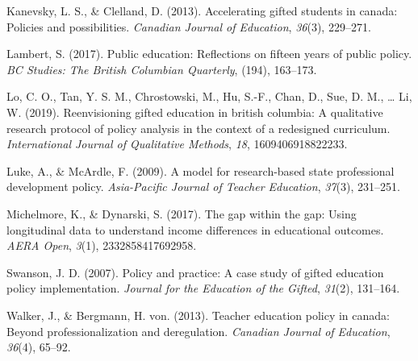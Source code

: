 \documentclass[
  english,
  man,floatsintext]{apa6}
\begin{document}
\leavevmode\hypertarget{ref-kanevsky_2013}{}%
Kanevsky, L. S., \& Clelland, D. (2013). Accelerating gifted students in canada: Policies and possibilities. \emph{Canadian Journal of Education}, \emph{36}(3), 229--271.

\leavevmode\hypertarget{ref-lambert_2017}{}%
Lambert, S. (2017). Public education: Reflections on fifteen years of public policy. \emph{BC Studies: The British Columbian Quarterly}, (194), 163--173.

\leavevmode\hypertarget{ref-lo_2019}{}%
Lo, C. O., Tan, Y. S. M., Chrostowski, M., Hu, S.-F., Chan, D., Sue, D. M., \ldots{} Li, W. (2019). Reenvisioning gifted education in british columbia: A qualitative research protocol of policy analysis in the context of a redesigned curriculum. \emph{International Journal of Qualitative Methods}, \emph{18}, 1609406918822233.

\leavevmode\hypertarget{ref-luke_2009}{}%
Luke, A., \& McArdle, F. (2009). A model for research-based state professional development policy. \emph{Asia-Pacific Journal of Teacher Education}, \emph{37}(3), 231--251.

\leavevmode\hypertarget{ref-michelmore_2017}{}%
Michelmore, K., \& Dynarski, S. (2017). The gap within the gap: Using longitudinal data to understand income differences in educational outcomes. \emph{AERA Open}, \emph{3}(1), 2332858417692958.

\leavevmode\hypertarget{ref-swanson_2007}{}%
Swanson, J. D. (2007). Policy and practice: A case study of gifted education policy implementation. \emph{Journal for the Education of the Gifted}, \emph{31}(2), 131--164.

\leavevmode\hypertarget{ref-walker_2013}{}%
Walker, J., \& Bergmann, H. von. (2013). Teacher education policy in canada: Beyond professionalization and deregulation. \emph{Canadian Journal of Education}, \emph{36}(4), 65--92.

\endgroup


\clearpage
\renewcommand{\listfigurename}{Figure captions}

\clearpage
\renewcommand{\listtablename}{Table captions}
\end{document}
